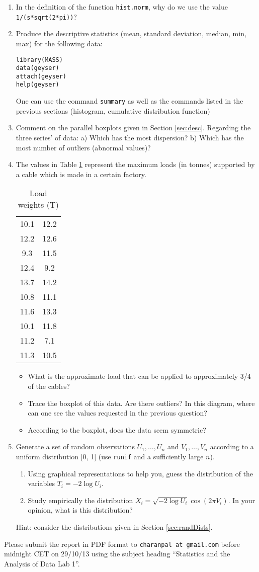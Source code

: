 \documentclass[a4paper,10pt]{article}
\begin{document}
\begin{enumerate} 
\item In the definition of the function \texttt{hist.norm}, why do we use the value \texttt{1/(s*sqrt(2*pi))}?
\item Produce the descriptive statistics (mean, standard deviation, median, min, max) for the following data: 
\begin{lstlisting} 
library(MASS)
data(geyser)
attach(geyser)
help(geyser)
\end{lstlisting}
One can use the command \texttt{summary} as well as the commands listed in the previous sections (histogram, cumulative distribution function) 
\item Comment on the parallel boxplots given in Section  \ref{sec:desc}. Regarding the three series' of data: a) Which has the most dispersion? b) Which has the most number of outliers (abnormal values)? 
\item The values in Table \ref{tab:loads} represent the maximum loads (in tonnes) supported by a cable which is made in a certain factory. 
\begin{table}[ht]
\begin{center}
\begin{tabular}{c c} 
\hline
10.1 & 12.2\\
12.2 & 12.6\\
9.3 & 11.5\\
12.4 & 9.2\\
13.7 & 14.2\\
10.8 & 11.1\\
11.6 & 13.3\\
10.1 & 11.8 \\
11.2 & 7.1\\
11.3 & 10.5\\
\hline
\end{tabular}
\end{center}
\caption{Load weights (T)}\label{tab:loads}
\end{table}
\begin{itemize}
\item What is the approximate load that can be applied to approximately 3/4 of the cables? 
\item Trace the boxplot of this data. Are there outliers? In this diagram, where can one see the values requested in the previous question? 
\item According to the boxplot, does the data seem symmetric? 
\end{itemize}
\item Generate a set of random observations $U_1 , \ldots , U_n$ and $V_1 ,\ldots , V_n$ according to a uniform distribution [0, 1] (use \texttt{runif} and a sufficiently large $n$). 
\begin{enumerate}
\item Using graphical representations to help you, guess the distribution of the variables $T_i = -2 \log U_i$. 
\item Study empirically the distribution $X_i = \sqrt{-2 \log U_i} \cos(2 \pi V_i ).$ In your opinion, what is this distribution? 
\end{enumerate}
Hint: consider the distributions given in Section \ref{sec:randDists}. 
\end{enumerate}

Please submit the report in PDF format to \texttt{charanpal at gmail.com} before midnight CET on 29/10/13 using the subject heading ``Statistics and the Analysis of Data Lab 1''. 
\end{document}
